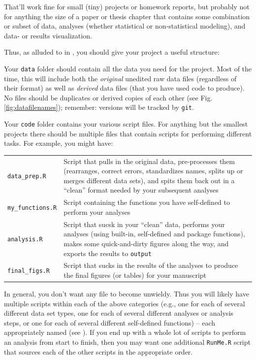 \documentclass[12pt,letterpaper]{article}
\begin{document}
That'll work fine for small (tiny) projects or homework reports, but probably not for anything the size of a paper or thesis chapter that contains some combination or subset of data, analyses (whether statistical or non-statistical modeling), and data- or results visualization.

Thus, as alluded to in , you should give your project a useful structure:

Your \texttt{data} folder should contain all the data you need for the project.  Most of the time, this will include both the \emph{original} unedited raw data files (regardless of their format) as well as \emph{derived} data files (that you have used code to produce).  No files should be duplicates or derived copies of each other (see Fig. \ref{fig:datafilenames}); remember: versions will be tracked by \texttt{git}. 

Your \texttt{code} folder contains your various script files.  For anything but the smallest projects there should be multiple files that contain scripts for performing different tasks.  For example, you might have: 

\begin{tabular}{p{0.2\linewidth}p{0.8\linewidth}}
	\texttt{data\_prep.R} & Script that pulls in the original data, pre-processes them (rearranges, correct errors, standardizes names, splits up or merges different data sets), and spits them back out in a ``clean'' format needed by your subsequent analyses \\
	\texttt{my\_functions.R} & Script containing the functions you have self-defined to perform your analyses \\
	\texttt{analysis.R} & Script that sucsk in your ``clean'' data, performs your analyses (using built-in, self-defined and package functions), makes some quick-and-dirty figures along the way, and exports the results to \texttt{output} \\
	\texttt{final\_figs.R} & Script that sucks in the results of the analyses to produce the final figures (or tables) for your manuscript\\

\end{tabular}

In general, you don't want any file to become unwieldy.  Thus you will likely have multiple scripts within each of the above categories (e.g., one for each of several different data set types, one for each of several different analyses or analysis steps, or one for each of several different self-defined functions) -- each appropriately named (see ).  If you end up with a whole lot of scripts to perform an analysis from start to finish, then you may want one additional \texttt{RunMe.R} script that sources each of the other scripts in the appropriate order.
\end{document}
